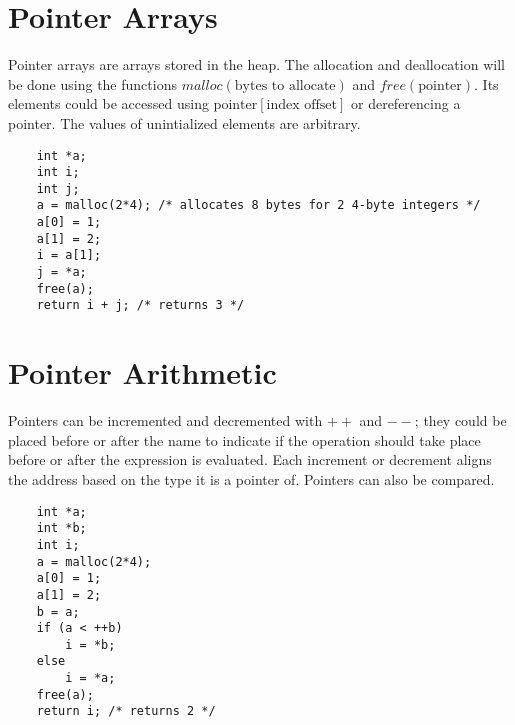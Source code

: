 \documentclass[11pt]{article}
\begin{document}
\section{Pointer Arrays}
Pointer arrays are arrays stored in the heap.
The allocation and deallocation will be done using the functions $malloc(\text{bytes to allocate})$ and $free(\text{pointer})$.
Its elements could be accessed using $\text{pointer}[\text{index offset}]$ or dereferencing a pointer.
The values of unintialized elements are arbitrary.
\begin{Verbatim}
	int *a;
	int i;
	int j;
	a = malloc(2*4); /* allocates 8 bytes for 2 4-byte integers */
	a[0] = 1;
	a[1] = 2;
	i = a[1];
	j = *a;
	free(a);
	return i + j; /* returns 3 */
\end{Verbatim}

\section{Pointer Arithmetic}
Pointers can be incremented and decremented with $++$ and $--$; they could be placed before or after the name to indicate if the operation should take place before or after the expression is evaluated.
Each increment or decrement aligns the address based on the type it is a pointer of.
Pointers can also be compared.
\begin{Verbatim}
	int *a;
	int *b;
	int i;
	a = malloc(2*4);
	a[0] = 1;
	a[1] = 2;
	b = a;
	if (a < ++b)
		i = *b;
	else
		i = *a;
	free(a);
	return i; /* returns 2 */
\end{Verbatim}
\end{document}
